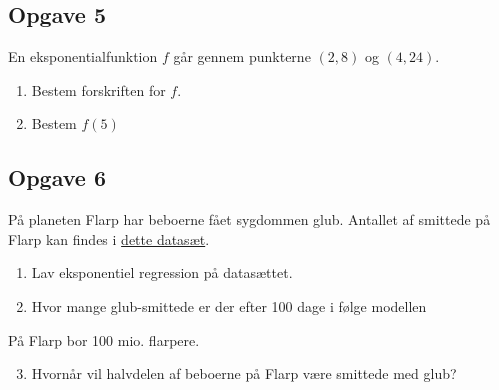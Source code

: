 \begin{center}
\end{center}


\subsection*{Opgave 5}
En eksponentialfunktion $f$ går gennem punkterne $(2,8)$ og $(4,24)$.
\begin{enumerate}[label=\roman*)]
	\item Bestem forskriften for $f$.
	\item Bestem $f(5)$
\end{enumerate}

\subsection*{Opgave 6}
På planeten Flarp har beboerne fået sygdommen glub. Antallet af smittede på Flarp kan findes i \href{https://github.com/ChristianJLex/TeachingNotes/raw/master/2023-2024/Data%20og%20lign/smittede.xlsx}{\color{blue!60} dette datasæt}.

\begin{enumerate}[label=\roman*)]
	\item Lav eksponentiel regression på datasættet.
	\item Hvor mange glub-smittede er der efter 100 dage i følge modellen
\end{enumerate}
På Flarp bor 100 mio. flarpere. 
\begin{enumerate}[label=\roman*)]
	\setcounter{enumi}{2}
	\item Hvornår vil halvdelen af beboerne på Flarp være smittede med glub?
\end{enumerate}
